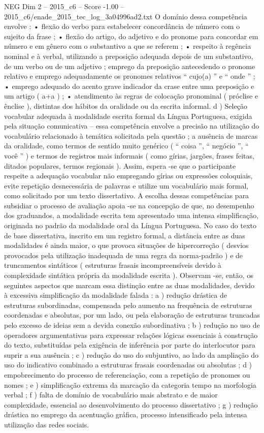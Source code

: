 \begin{textsample}{NEG Dim 2 – 2015\_c6 – Score -1.00 – 2015\_c6/enade\_2015\_tec\_log\_3a04996ad2.txt}
O domínio dessa competência envolve : • flexão do verbo para estabelecer concordância de número com o sujeito da frase ; • flexão do artigo, do adjetivo e do pronome para concordar em número e em gênero com o substantivo a que se referem ; • respeito à regência nominal e à verbal, utilizando a preposição adequada depois de um substantivo, de um verbo ou de um adjetivo ; emprego da preposição antecedendo o pronome relativo e emprego adequadamente os pronomes relativos “ cujo(a) ” e “ onde ” ; • emprego adequado do acento grave indicador da crase entre uma preposição e um artigo ( a+a ) ; • atendimento às regras de colocação pronominal ( próclise e ênclise ), distintas dos hábitos da oralidade ou da escrita informal. d ) Seleção vocabular adequada à modalidade escrita formal da Língua Portuguesa, exigida pela situação comunicativa – essa competência envolve a precisão na utilização do vocabulário relacionado à temática solicitada pela questão ; a ausência de marcas da oralidade, como termos de sentido muito genérico ( “ coisa ”, “ negócio ”, “ você ” ) e termos de registros mais informais ( como gírias, jargões, frases feitas, ditados populares, termos regionais ).
Assim, espera -se que o participante respeite a adequação vocabular não empregando gírias ou expressões coloquiais, evite repetição desnecessária de palavras e utilize um vocabulário mais formal, como solicitado por um texto dissertativo.
A escolha dessas competências para subsidiar o processo de avaliação apoia -se na concepção de que, no desempenho dos graduandos, a modalidade escrita tem apresentado uma intensa simplificação, originada no padrão da modalidade oral da Língua Portuguesa.
No caso do texto de base dissertativa, inscrito em um registro formal, a distância entre as duas modalidades é ainda maior, o que provoca situações de hipercorreção ( desvios provocados pela utilização inadequada de uma regra da norma-padrão ) e de truncamentos sintáticos ( estruturas frasais incompreensíveis devido à complexidade sintática própria da modalidade escrita ).
Observam -se, então, os seguintes aspectos que marcam essa distinção entre as duas modalidades, devido à excessiva simplificação da modalidade falada : a ) redução drástica de estruturas subordinadas, compensada pelo aumento na frequência de estruturas coordenadas e absolutas, por um lado, ou pela elaboração de estruturas truncadas pelo excesso de ideias sem a devida conexão subordinativa ; b ) redução no uso de operadores argumentativas para expressar relações lógicas essenciais à construção do texto, substituídas pela exigência de inferência por parte do interlocutor para suprir a sua ausência ; c ) redução do uso do subjuntivo, ao lado da ampliação do uso do indicativo combinado a estruturas frasais coordenadas ou absolutas ; d ) empobrecimento do processo de referenciação, com a repetição de pronomes ou nomes ; e ) simplificação extrema da marcação da categoria tempo na morfologia verbal ; f ) falta de domínio de vocabulário mais abstrato e de maior complexidade, essencial ao desenvolvimento do processo dissertativo ; g ) redução drástica no emprego da acentuação gráfica, processo intensificado pela intensa utilização das redes sociais.

\end{textsample}

